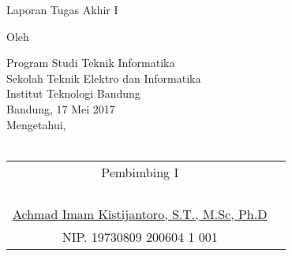 \clearpage
\pagestyle{empty}

\begin{center}
\smallskip

    \Large \bfseries \MakeUppercase{\thetitle}
    \vfill

    \Large Laporan Tugas Akhir I
    \vfill

    \large Oleh

    \Large \theauthor

    \large Program Studi Teknik Informatika \\
    Sekolah Teknik Elektro dan Informatika \\
    Institut Teknologi Bandung \\

    \vfill
    \normalsize \normalfont
    Bandung, 17 Mei 2017 \\
    Mengetahui, \\~\\

    \setlength{\tabcolsep}{12pt}
    \begin{tabular}{c@{\hskip 0.5in}c}
        Pembimbing I \\
         \\
         \\
         \\
         \\
        \underline{Achmad Imam Kistijantoro, S.T., M.Sc, Ph.D} \\
        NIP. 19730809 200604 1 001 \\
    \end{tabular}

\end{center}
\clearpage
